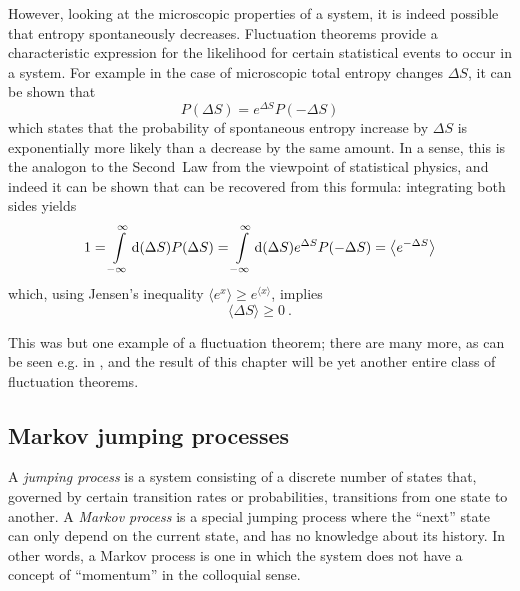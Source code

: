 However, looking at the microscopic properties of a system, it is indeed possible that entropy spontaneously decreases. Fluctuation theorems provide a characteristic expression for the likelihood for certain statistical events to occur in a system. For example in the case of microscopic total entropy changes \(\Delta S\), it can be shown that
%
\begin{equation}
	P(\Delta S) = e^{\Delta S}P(-\Delta S)
\end{equation}
%
which states that the probability of spontaneous entropy increase by \(\Delta S\) is exponentially more likely than a decrease by the same amount. In a sense, this is the analogon to the Second~Law from the viewpoint of statistical physics, and indeed it can be shown that  can be recovered from this formula: integrating both sides yields
%
\begin{equation}
	1 = \int\limits_{-\infty}^\infty \mathrm{d} (\Delta S) P(\Delta S) = \int\limits_{-\infty}^\infty \mathrm{d} (\Delta S) e^{\Delta S}P(-\Delta S) = \left\langle e^{-\Delta S} \right\rangle
\end{equation}
%
which, using Jensen's inequality \(\langle e^x\rangle \geq e^{\langle x\rangle}\), implies
%
\begin{equation}
	\langle\Delta S\rangle \geq 0 ~.
\end{equation}

This was but one example of a fluctuation theorem; there are many more, as can be seen e.g. in \cite{seifert-review}, and the result of this chapter will be yet another entire class of fluctuation theorems.





\subsection{Markov jumping processes}
\label{sec:markov process}

A \emph{jumping process} is a system consisting of a discrete number of states that, governed by certain transition rates or probabilities, transitions from one state to another. A \emph{Markov process} is a special jumping process where the ``next'' state can only depend on the current state, and has no knowledge about its history. In other words, a Markov process is one in which the system does not have a concept of ``momentum'' in the colloquial sense.

